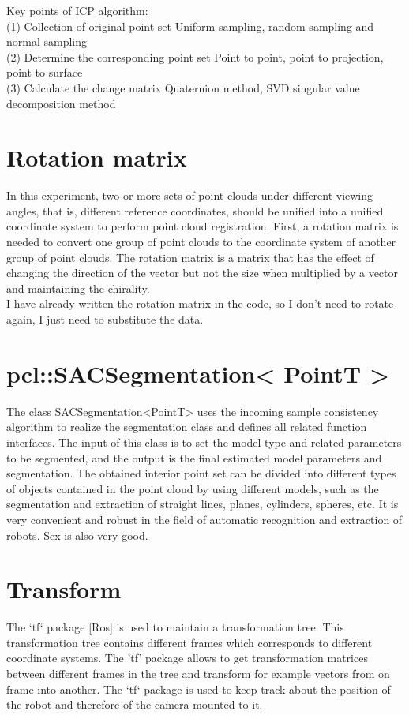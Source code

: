 Key points of ICP algorithm:\\
(1) Collection of original point set Uniform sampling, random sampling and normal sampling\\
(2) Determine the corresponding point set Point to point, point to projection, point to surface\\
(3) Calculate the change matrix Quaternion method, SVD singular value decomposition method\\

\section{Rotation matrix}
In this experiment, two or more sets of point clouds under different viewing angles, that is, different reference coordinates, should be unified into a unified coordinate system to perform point cloud registration. First, a rotation matrix is needed to convert one group of point clouds to the coordinate system of another group of point clouds. The rotation matrix is a matrix that has the effect of changing the direction of the vector but not the size when multiplied by a vector and maintaining the chirality.\\
I have already written the rotation matrix in the code, so I don’t need to rotate again, I just need to substitute the data.\\

\section{pcl::SACSegmentation< PointT >}
The class SACSegmentation<PointT> uses the incoming sample consistency algorithm to realize the segmentation class and defines all related function interfaces. The input of this class is to set the model type and related parameters to be segmented, and the output is the final estimated model parameters and segmentation. The obtained interior point set can be divided into different types of objects contained in the point cloud by using different models, such as the segmentation and extraction of straight lines, planes, cylinders, spheres, etc. It is very convenient and robust in the field of automatic recognition and extraction of robots. Sex is also very good.
\section{Transform}
The ‘tf‘ package [Ros] is used to maintain a transformation tree. This transformation
tree contains different frames which corresponds to different coordinate systems. The
’tf’ package allows to get transformation matrices between different frames in the
tree and transform for example vectors from on frame into another. The ‘tf‘ package
is used to keep track about the position of the robot and therefore of the camera
mounted to it.
